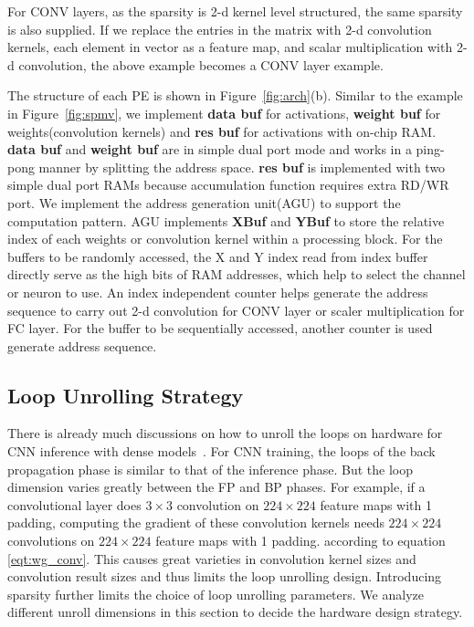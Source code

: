 For CONV layers, as the sparsity is 2-d kernel level structured, the same sparsity is also supplied. If we replace the entries in the matrix with 2-d convolution kernels, each element in vector as a feature map, and scalar multiplication with 2-d convolution, the above example becomes a CONV layer example.

The structure of each PE is shown in Figure~\ref{fig:arch}(b). Similar to the example in Figure~\ref{fig:spmv}, we implement {\bf{data buf}} for activations, {\bf{weight buf}} for weights(convolution kernels) and {\bf{res buf}} for activations with on-chip RAM. {\bf{data buf}} and {\bf{weight buf}} are in simple dual port mode and works in a ping-pong manner by splitting the address space. {\bf{res buf}} is implemented with two simple dual port RAMs because accumulation function requires extra RD/WR port. We implement the address generation unit(AGU) to support the computation pattern. AGU implements {\bf{XBuf}} and {\bf{YBuf}} to store the relative index of each weights or convolution kernel within a processing block. For the buffers to be randomly accessed, the X and Y index read from index buffer directly serve as the high bits of RAM addresses, which help to select the channel or neuron to use. An index independent counter helps generate the address sequence to carry out 2-d convolution for CONV layer or scaler multiplication for FC layer. For the buffer to be sequentially accessed, another counter is used generate address sequence.

\subsection{Loop Unrolling Strategy}\label{sec:hw_unroll}

There is already much discussions on how to unroll the loops on hardware for CNN inference with dense models~\cite{zhang2015optimizing,mao2017exploring}. For CNN training, the loops of the back propagation phase is similar to that of the inference phase. But the loop dimension varies greatly between the FP and BP phases. For example, if a convolutional layer does $3\times 3$ convolution on $224\times 224$ feature maps with 1 padding, computing the gradient of these convolution kernels needs $224\times 224$ convolutions on $224\times 224$ feature maps with 1 padding. according to equation \ref{eqt:wg_conv}. This causes great varieties in convolution kernel sizes and convolution result sizes and thus limits the loop unrolling design. Introducing sparsity further limits the choice of loop unrolling parameters. We analyze different unroll dimensions in this section to decide the hardware design strategy.

